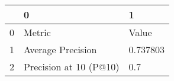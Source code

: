 \begin{tabular}{lll}
\toprule
{} &                       0 &         1 \\
\midrule
0 &                  Metric &     Value \\
1 &       Average Precision &  0.737803 \\
2 &  Precision at 10 (P@10) &       0.7 \\
\bottomrule
\end{tabular}
